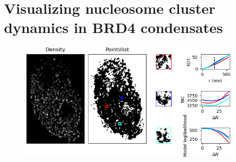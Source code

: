 \documentclass{ucetd}
\begin{document}
\section{Visualizing nucleosome cluster dynamics in BRD4 condensates}

\begin{figure}
\begin{center}
\includegraphics[width=16cm]{Cluster.png}
\end{center}
\end{figure}
\end{document}
